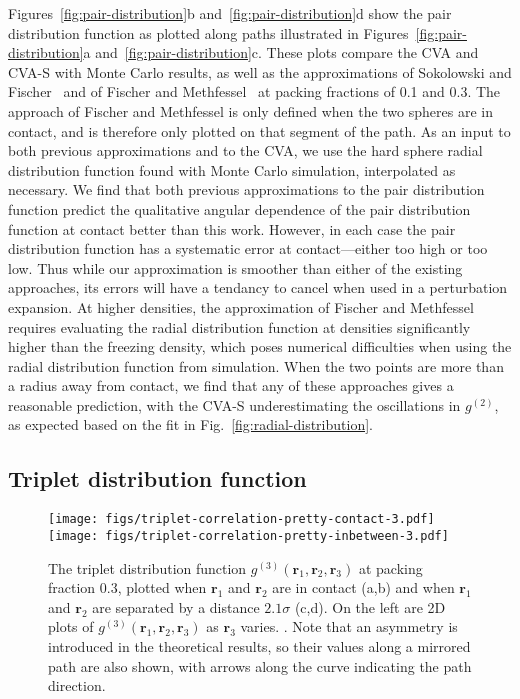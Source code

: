\documentclass[letterpaper,twocolumn,amsmath,amssymb,pre,aps,10pt]{revtex4-1}
\newcommand{\rr}{\textbf{r}}
\begin{document}
Figures~\ref{fig:pair-distribution}b and~\ref{fig:pair-distribution}d
show the pair distribution function as plotted along paths illustrated
in Figures~\ref{fig:pair-distribution}a
and~\ref{fig:pair-distribution}c.  These plots compare the CVA and
CVA-S with Monte Carlo results, as well as the approximations of
Sokolowski and Fischer~\cite{sokolowski1992role} and of Fischer and
Methfessel~\cite{fischer1980born} at packing fractions of 0.1 and 0.3.
The approach of Fischer and Methfessel is only defined when the two
spheres are in contact, and is therefore only plotted on that segment
of the path.  As an input to both previous approximations and to the
CVA, we use the hard sphere radial distribution function found with
Monte Carlo simulation, interpolated as necessary. We find that both
previous approximations to the pair distribution function predict the
qualitative angular dependence of the pair distribution function at
contact better than this work.  However, in each case the pair
distribution function has a systematic error at contact---either too
high or too low.  Thus while our approximation is smoother than either
of the existing approaches, its errors will have a tendancy to cancel
when used in a perturbation expansion.  At higher densities, the
approximation of Fischer and Methfessel requires evaluating the radial
distribution function at densities significantly higher than the
freezing density, which poses numerical difficulties when using the
radial distribution function from simulation.  When the two points are
more than a radius away from contact, we find that any of these
approaches gives a reasonable prediction, with the CVA-S
underestimating the oscillations in $g^{(2)}$, as expected based on
the fit in Fig.~\ref{fig:radial-distribution}.

\subsection{Triplet distribution function}

\begin{figure*}
  \texttt{[image: figs/triplet-correlation-pretty-contact-3.pdf]}
\\
  \texttt{[image: figs/triplet-correlation-pretty-inbetween-3.pdf]}
  \caption{The triplet distribution function
    $g^{(3)}(\rr_1,\rr_2,\rr_3)$ at packing fraction 0.3, plotted when
    $\rr_1$ and $\rr_2$ are in contact (a,b) and when $\rr_1$ and
    $\rr_2$ are separated by a distance $2.1\sigma$ (c,d). On the left
    are 2D plots of $g^{(3)}(\rr_1,\rr_2,\rr_3)$ as $\rr_3$
    varies. \plotcomp{$g^{(3)}(\rr_1,\rr_2,\rr_3)$}. Note that an
    asymmetry is introduced in the theoretical results, so their
    values along a mirrored path are also shown, with arrows along the
    curve indicating the path
    direction.} \label{fig:triplet-contact-distribution}
\end{figure*}
\end{document}
